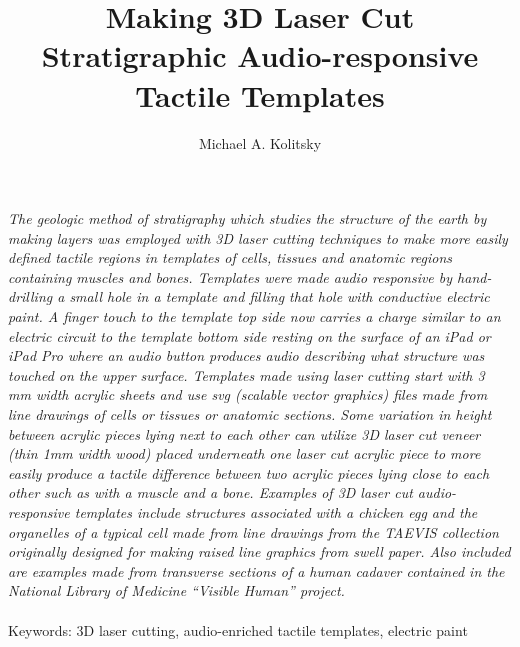 \documentclass[11.5pt]{sig-alternate} %
\makeatletter
\let\oldabstract\abstract
\let\oldendabstract\endabstract
\renewenvironment{abstract} %
{\renewenvironment{quotation}%
               {\list{}{\addtolength{\leftmargin}{1em} %
                        \listparindent 1.5em%
                        \itemindent    \listparindent%
                        \rightmargin   \leftmargin%
                        \parsep        \z@ \@plus\p@}%
                \item\relax}%
               {\endlist}%
\oldabstract}
{\oldendabstract}
\makeatother
\begin{document}
\title{Making 3D Laser Cut Stratigraphic Audio-responsive Tactile Templates}

\author[1]{\large \color{blue}Michael A. Kolitsky}


\toappear{}
\maketitle
\begin{@twocolumnfalse} 
\begin{abstract}
\item 
\textit{The geologic method of stratigraphy which studies the structure of the earth by making layers was employed with 3D laser cutting techniques to make more easily defined tactile regions in templates of cells, tissues and anatomic regions containing muscles and bones. Templates were made audio responsive by hand-drilling a small hole in a template and filling that hole with conductive electric paint. A finger touch to the template top side now carries a charge similar to an electric circuit to the template bottom side resting on the surface of an iPad or iPad Pro where an audio button produces audio describing what structure was touched on the upper surface. Templates made using laser cutting start with 3 mm width acrylic sheets and use svg (scalable vector graphics) files made from line drawings of cells or tissues or anatomic sections. Some variation in height between acrylic pieces lying next to each other can utilize 3D laser cut veneer (thin 1mm width wood) placed underneath one laser cut acrylic piece to more easily produce a tactile difference between two acrylic pieces lying close to each other such as with a muscle and a bone. Examples of 3D laser cut audio-responsive templates include structures associated with a chicken egg and the organelles of a typical cell made from line drawings from the TAEVIS collection originally designed for making raised line graphics from swell paper. Also included are examples made from transverse sections of a human cadaver contained in the National Library of Medicine “Visible Human” project.}
\\ \\
Keywords: 3D laser cutting, audio-enriched tactile templates, electric paint
\end{abstract}
\end{@twocolumnfalse}

\end{document}
